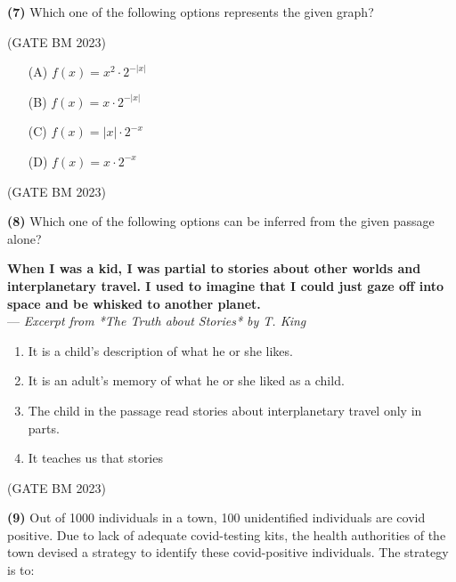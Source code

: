 \documentclass[journal]{IEEEtran}
\numberwithin{equation}{enumi}
\numberwithin{figure}{enumi}
\begin{document}
\textbf{(7)}
Which one of the following options represents the given graph?

\hfill (GATE BM 2023)

\begin{center}
\end{center}

\begin{enumerate}
    \item[(A)] \( f(x) = x^2 \cdot 2^{-|x|} \)
    \item[(B)] \( f(x) = x \cdot 2^{-|x|} \)
    \item[(C)] \( f(x) = |x| \cdot 2^{-x} \)
    \item[(D)] \( f(x) = x \cdot 2^{-x} \)
     \end{enumerate}
     \hfill (GATE BM 2023)
     
        \textbf{(8)}
Which one of the following options can be inferred from the given passage alone?

\medskip

\noindent
\textbf{When I was a kid, I was partial to stories about other worlds and interplanetary travel. I used to imagine that I could just gaze off into space and be whisked to another planet.}\\
\hfill --- \textit{Excerpt from *The Truth about Stories* by T. King}

\medskip

\begin{enumerate}
    \item It is a child's description of what he or she likes.
    \item It is an adult's memory of what he or she liked as a child.
    \item The child in the passage read stories about interplanetary travel only in parts.
    \item It teaches us that stories
    \end{enumerate}
    \hfill (GATE BM 2023)
    
  \textbf{(9)}
Out of 1000 individuals in a town, 100 unidentified individuals are covid positive. Due to lack of adequate covid-testing kits, the health authorities of the town devised a strategy to identify these covid-positive individuals. The strategy is to:
\end{document}

